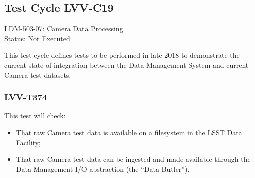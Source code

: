 \documentclass[DM,lsstdraft,STR,toc]{lsstdoc}
\providecommand{\tightlist}{
  \setlength{\itemsep}{0pt}\setlength{\parskip}{0pt}}
\begin{document}
\subsection{Test Cycle LVV-C19}

LDM-503-07: Camera Data Processing\\
Status: Not Executed


This test cycle defines tests to be performed in late 2018 to
demonstrate the current state of integration between the Data Management
System and current Camera test datasets.



\subsubsection{LVV-T374}

This test will check:

\begin{itemize}
\tightlist
\item
  That raw Camera test data is available on a filesystem in the LSST
  Data Facility;
\item
  That raw Camera test data can be ingested and made available through
  the Data Management I/O abstraction (the ``Data Butler'').
\end{itemize}
\end{document}
